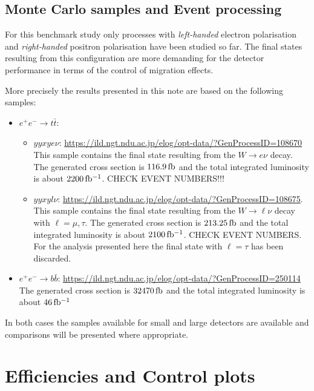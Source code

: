 \documentclass[preprint]{elsarticle}
\begin{document}
\subsection{ Monte Carlo samples and Event processing}
For this benchmark study only processes with {\em left-handed} electron polarisation and {\em right-handed} positron polarisation have been studied so far. The final states resulting from this configuration are more demanding for the detector performance in terms of the control of migration effects. 

More precisely the results presented in this note are based on the following samples:
\begin{itemize}
\item $e^+e^-\rightarrow t\bar{t}$: 
\begin{itemize}
\item  $yyxye\nu$: \url{https://ild.ngt.ndu.ac.jp/elog/opt-data/?GenProcessID=108670}\\
This sample contains the final state resulting from the $W\rightarrow e\nu$ decay.
The generated cross section is $116.9\,{\rm fb}$ and the total integrated luminosity is about $2200\,{\rm fb^{-1}}$. CHECK EVENT NUMBERS!!!
\item  $yyxyl\nu$: \url{https://ild.ngt.ndu.ac.jp/elog/opt-data/?GenProcessID=108675}. \\  
This sample contains the final state resulting from the $W\rightarrow \ell\nu$ decay with $\ell=\mu,\tau$.
The generated cross section is $213.25\,{\rm fb}$ and the total integrated luminosity is about $2100\,{\rm fb^{-1}}$. CHECK EVENT NUMBERS.
For the analysis presented here the final state with $\ell=\tau$ has been discarded.
\end{itemize}
\item  $e^+e^-\rightarrow b\bar{b}$:  \url{https://ild.ngt.ndu.ac.jp/elog/opt-data/?GenProcessID=250114}
The generated cross section is $32470\,{\rm fb}$ and the total integrated luminosity is about $46\,{\rm fb^{-1}}$
\end{itemize}

In both cases the samples available for small and large detectors are available and comparisons will be presented where appropriate. 

\section{Efficiencies and Control plots }
\end{document}

